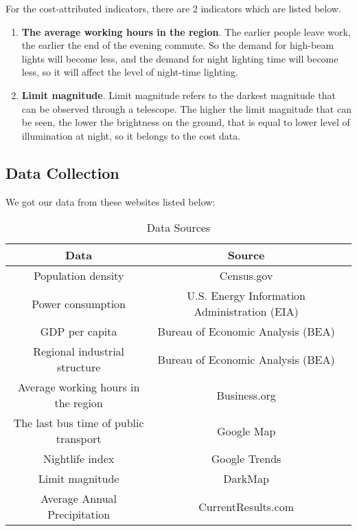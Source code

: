 For the cost-attributed indicators, there are 2 indicators which are listed below.
\begin{enumerate}
    \item \textbf{The average working hours in the region}. The earlier people leave work, the earlier the end of the evening commute. So the demand for high-beam lights will become less, and the demand for night lighting time will become less, so it will affect the level of night-time lighting.
    
    \item \textbf{Limit magnitude}. Limit magnitude refers to the darkest magnitude that can be observed through a telescope. The higher the limit magnitude that can be seen, the lower the brightness on the ground, that is equal to lower level of illumination at night, so it belongs to the cost data.
\end{enumerate}


\subsection{Data Collection}
We got our data from these websites listed below:
\begin{table}[H] \centering
    \caption{Data Sources}
    \begin{tabular}{ccl}
        \toprule
        Data & Source\\ \hline
        Population density & Census.gov \cite{bureau_historical_nodate} \\
        Power consumption & U.S. Energy Information Administration (EIA) \cite{eia} \\
        GDP per capita & Bureau of Economic Analysis (BEA)\cite{bea} \\
        Regional industrial structure & Bureau of Economic Analysis (BEA)\cite{bea} \\
        Average working hours in the region & Business.org \cite{overwork}\\
        The last bus time of public transport & Google Map \cite{google_map}\\
        Nightlife index & Google Trends \cite{nightlife_index} \\
        Limit magnitude & DarkMap \cite{darkmap} \\
        Average Annual Precipitation & CurrentResults.com \cite{currentresults} \\
        \bottomrule
    \end{tabular}
\end{table}
